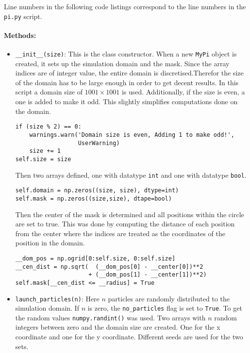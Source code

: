 \documentclass{aa}
\begin{document}
Line numbers in the following code listings correspond to the line numbers in the \verb+pi.py+
script.

\paragraph{Methods:}
\begin{itemize}
    \item \verb+__init__(size)+: This is the class constructor. When a new \verb+MyPi+ object
        is created, it sets up the simulation domain and the mask. Since the array indices are
        of integer value, the entire domain is discretised.Therefor the size of the domain has
        to be large enough in order to get decent results. In this script a domain size of
        \(1001 \times 1001\) is used. Additionally, if the size is even, a one is added to make
        it odd. This slightly simplifies computations done on the domain.
\begin{lstlisting}[firstnumber=104]
if (size % 2) == 0:
    warnings.warn('Domain size is even, Adding 1 to make odd!',
                  UserWarning)
    size += 1
self.size = size
\end{lstlisting}
        Then two arrays defined, one with datatype \verb+int+ and one with datatype
        \verb+bool+.
\begin{lstlisting}[firstnumber=104]
self.domain = np.zeros((size, size), dtype=int)
self.mask = np.zeros((size,size), dtape=bool)
\end{lstlisting}
        Then the center of the mask is determined and all positions within the circle are set
        to true. This was done by computing the distance of each position from the center where
        the indices are treated as the coordinates of the position in the domain. 
\begin{lstlisting}[firstnumber=117]
__dom_pos = np.ogrid[0:self.size, 0:self.size]
__cen_dist = np.sqrt(  (__dom_pos[0] - __center[0])**2
                     + (__dom_pos[1] - __center[1])**2)
self.mask[__cen_dist <= __radius] = True
\end{lstlisting}
    \item \verb+launch_particles(n)+: Here \(n\) particles are randomly distributed to the
        simulation domain. If \(n\) is zero, the \verb+no_particles+ flag is set to
        \verb+True+. To get the random values \verb+numpy.randint()+ was used. Two arrays with
        \(n\) random integers between zero and the domain size are created. One for the x
        coordinate and one for the y coordinate. Different seeds are used for the two sets. 

\end{itemize}
\end{document}
